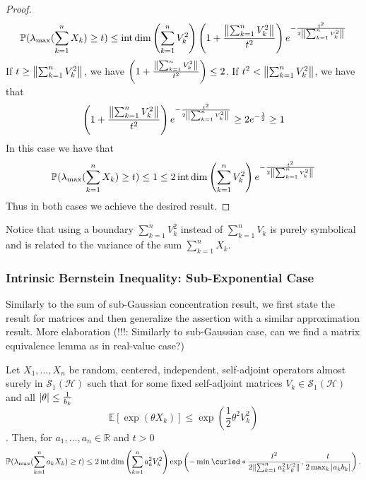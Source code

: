 \begin{proof}
    \[ \mathbb{P}(\lambda_{\text{max}} (\sum_{k=1}^{n}X_k) \geq t) \leq \operatorname{int\, dim}\left(\sum_{k=1}^{n} V_k^{2}\right) \left(1+ \frac{\norm{\sum_{k=1}^{n}V_k^{2}}_{}}{t^{2}}\right) e^{-\frac{t^{2}}{2 \norm{ \sum_{k=1}^{n}V_k^{2}}_{}}} \]
    If  \( t \geq \norm{\sum_{k=1}^{n}V_k^{2}}_{} \), we have \( \left(1+\frac{\norm{\sum_{k=1}^{n}V_k^{2}}_{}}{t^{2}}\right) \leq 2 \). If \( t^{2} < \norm{\sum_{k=1}^{n}V_k^{2}}_{} \), we have that 
    \[ \left(1+\frac{\norm{\sum_{k=1}^{n}V_k^{2}}_{}}{t^{2}}\right) e^{-\frac{t^{2}}{2 \norm{\sum_{k=1}^{n}V_k^{2}}_{}}} \geq 2 e^{-\frac{1}{2}} \geq 1 \]
    In this case we have that 
    \[ \mathbb{P}(\lambda_{\text{max}} (\sum_{k=1}^{n}X_k) \geq t) \leq 1 \leq 2 \operatorname{int\, dim}\left(\sum_{k=1}^{n}V_k^{2}\right) e^{- \frac{t^{2}}{2 \norm{\sum_{k=1}^{n}V_k^{2}}_{}}} \]
    Thus in both cases we achieve the desired result.
\end{proof}
Notice that using a boundary \( \sum_{k=1}^{n} V_k^{2}  \) instead of \( \sum_{k=1}^{n} V_k \) is purely symbolical and is related to the variance of the sum \( \sum_{k=1}^{n}X_k \). 

\subsubsection{Intrinsic Bernstein Inequality: Sub-Exponential Case}
Similarly to the sum of sub-Gaussian concentration result, we first state the result for matrices and then generalize the assertion with a similar approximation result.
More elaboration (!!!: Similarly to sub-Gaussian case, can we find a matrix equivalence lemma as in real-value case?)


\begin{thm}
      Let \( X_1, \dots, X_n \) be random, centered, independent, self-adjoint operators almost surely in \( \mathcal{S}_1(\mathcal{H}) \) such that for some fixed self-adjoint matrices \( V_k \in \mathcal{S}_1(\mathcal{H})\) and all \( \abs{\theta} \leq \frac{1}{b_k} \)
    \[ \mathbb{E}[\operatorname{exp}(\theta X_k)] \leq \operatorname{exp}(\frac{1}{2} \theta^{2}V_k^{2}) \]. Then, for \( a_1,\dots, a_n\in \mathbb{R} \) and \( t >0 \)
    \[ \mathbb{P}(\lambda_{\text{max}} (\sum_{k=1}^{n}a_kX_k) \geq t) \leq 2\operatorname{int\, dim}\left(\sum_{k=1}^{n}a_k^{2}V_k^{2}\right) \operatorname{exp}\left(-\min_{}\curled*{\frac{t^{2}}{2\norm{\sum_{k=1}^{n}a_k^{2}V_k^2}_{}}, \frac{t}{2\max_{k}\abs{a_kb_k}}}\right). \]
\end{thm}

